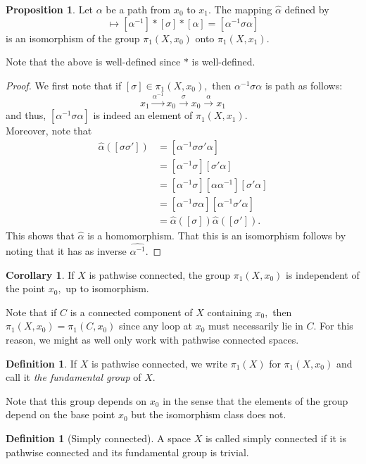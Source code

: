 \documentclass[12pt]{article}
\theoremstyle{definition}
\numberwithin{thm}{section}
\newtheorem{defn}[thm]{Definition}
\newtheorem{prop}[thm]{Proposition}
\newtheorem{cor}[thm]{Corollary}
\begin{document}
\begin{prop}
	Let $\alpha$ be a path from $x_0$ to $x_1.$ The mapping $\widehat{\alpha}$ defined by
	\begin{equation*} 
		[\sigma] \mapsto [\alpha^{-1}]*[\sigma]*[\alpha] = [\alpha^{-1}\sigma\alpha]
	\end{equation*}
	is an isomorphism of the group $\pi_1(X, x_0)$ onto $\pi_1(X, x_1).$
\end{prop}
Note that the above is well-defined since $*$ is well-defined.
\begin{proof} 
	We first note that if $[\sigma] \in \pi_1(X, x_0),$ then $\alpha^{-1}\sigma\alpha$ is path as follows:
	\begin{equation*} 
		x_1 \overset{\alpha^{-1}}{\longrightarrow} x_0 \overset{\sigma}{\longrightarrow} x_0 \overset{\alpha}{\longrightarrow} x_1
	\end{equation*}
	and thus, $[\alpha^{-1}\sigma\alpha]$ is indeed an element of $\pi_1(X, x_1).$\\
	Moreover, note that
	\begin{align*} 
		\widehat{\alpha}([\sigma\sigma']) &= [\alpha^{-1}\sigma\sigma'\alpha]\\
		&= [\alpha^{-1}\sigma][\sigma'\alpha]\\
		&= [\alpha^{-1}\sigma][\alpha\alpha^{-1}][\sigma'\alpha]\\
		&= [\alpha^{-1}\sigma\alpha][\alpha^{-1}\sigma'\alpha]\\
		&= \widehat{\alpha}([\sigma])\widehat{\alpha}([\sigma']).
	\end{align*}
	This shows that $\widehat{\alpha}$ is a homomorphism. That this is an isomorphism follows by noting that it has as inverse $\widehat{\alpha^{-1}}.$
\end{proof}
\begin{cor}
	If $X$ is pathwise connected, the group $\pi_1(X, x_0)$ is independent of the point $x_0,$ up to isomorphism.
\end{cor}
Note that if $C$ is a connected component of $X$ containing $x_0,$ then $\pi_1(X, x_0) = \pi_1(C, x_0)$ since any loop at $x_0$ must necessarily lie in $C.$ For this reason, we might as well only work with pathwise connected spaces.
\begin{defn}
	If $X$ is pathwise connected, we write $\pi_1(X)$ for $\pi_1(X, x_0)$ and call it \emph{the fundamental group} of $X.$
\end{defn}
Note that this group depends on $x_0$ in the sense that the elements of the group depend on the base point $x_0$ but the isomorphism class does not.\\
\begin{defn}[Simply connected]
	A space $X$ is called simply connected if it is pathwise connected and its fundamental group is trivial.
\end{defn}
\end{document}
